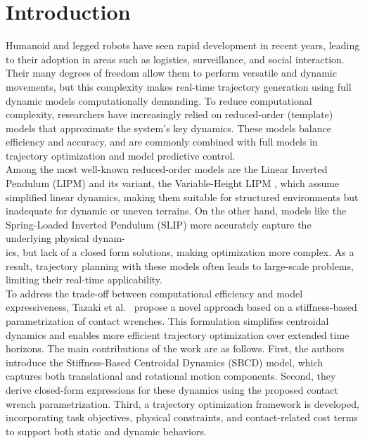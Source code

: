 \documentclass[main.tex]{subfiles}
\begin{document}
\begin{sloppypar}
\section{Introduction}
\label{sec:introduction}
Humanoid and legged robots have seen rapid development in recent years, leading to their adoption in areas such as logistics, surveillance, and social interaction. Their many degrees of freedom allow them to perform versatile and dynamic movements, but this complexity makes real-time trajectory generation using full dynamic models computationally demanding. To reduce computational complexity, researchers have increasingly relied on reduced-order (template) models that approximate the system’s key dynamics. These models balance efficiency and accuracy, and are commonly combined with full models in trajectory optimization and model predictive control. \\
Among the most well-known reduced-order models are the Linear Inverted Pendulum (LIPM) \cite{kajita1991study} and its variant, the Variable-Height LIPM \cite{caron2020biped}, which assume simplified linear dynamics, making them suitable for structured environments but inadequate for dynamic or uneven terrains. On the other hand, models like the Spring-Loaded Inverted Pendulum (SLIP) \cite{poulakakis2009spring} more accurately capture the underlying physical dynam-\\ics, but lack of a closed form solutions, making optimization more complex. As a result, trajectory planning with these models often leads to large-scale problems, limiting their real-time applicability.\\
To address the trade-off between computational efficiency and model expressiveness, Tazaki et al.~\cite{tazaki2024trajectory} propose a novel approach based on a stiffness-based parametrization of contact wrenches. This formulation simplifies centroidal dynamics and enables more efficient trajectory optimization over extended time horizons. The main contributions of the work are as follows. First, the authors introduce the Stiffness-Based Centroidal Dynamics (SBCD) model, which captures both translational and rotational motion components. Second, they derive closed-form expressions for these dynamics using the proposed contact wrench parametrization. Third, a trajectory optimization framework is developed, incorporating task objectives, physical constraints, and contact-related cost terms to support both static and dynamic behaviors.\\

\end{sloppypar}
\end{document}
